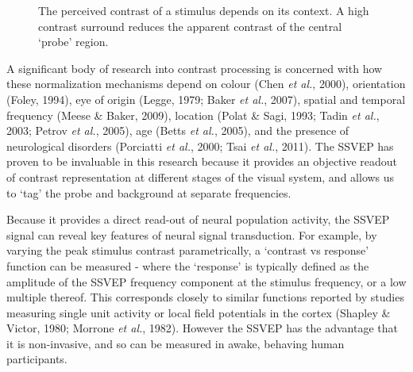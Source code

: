\documentclass[
  letterpaper,
  DIV=11,
  numbers=noendperiod]{scrartcl}
\begin{document}
\begin{figure}


\caption{\label{fig-centresurround}The perceived contrast of a stimulus
depends on its context. A high contrast surround reduces the apparent
contrast of the central `probe' region.}

\end{figure}%

A significant body of research into contrast processing is concerned
with how these normalization mechanisms depend on colour (Chen \emph{et
al.}, 2000), orientation (Foley, 1994), eye of origin (Legge, 1979;
Baker \emph{et al.}, 2007), spatial and temporal frequency (Meese \&
Baker, 2009), location (Polat \& Sagi, 1993; Tadin \emph{et al.}, 2003;
Petrov \emph{et al.}, 2005), age (Betts \emph{et al.}, 2005), and the
presence of neurological disorders (Porciatti \emph{et al.}, 2000; Tsai
\emph{et al.}, 2011). The SSVEP has proven to be invaluable in this
research because it provides an objective readout of contrast
representation at different stages of the visual system, and allows us
to `tag' the probe and background at separate frequencies.

Because it provides a direct read-out of neural population activity, the
SSVEP signal can reveal key features of neural signal transduction. For
example, by varying the peak stimulus contrast parametrically, a
`contrast vs response' function can be measured - where the `response'
is typically defined as the amplitude of the SSVEP frequency component
at the stimulus frequency, or a low multiple thereof. This corresponds
closely to similar functions reported by studies measuring single unit
activity or local field potentials in the cortex (Shapley \& Victor,
1980; Morrone \emph{et al.}, 1982). However the SSVEP has the advantage
that it is non-invasive, and so can be measured in awake, behaving human
participants.
\end{document}
